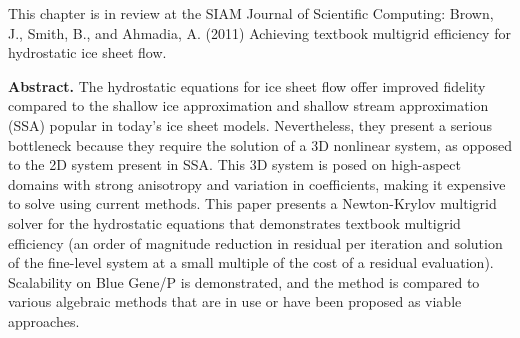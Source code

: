\newcommand\citep[1]{\cite{#1}}
\textsf{This chapter is in review at the SIAM Journal of Scientific Computing: Brown, J., Smith, B., and Ahmadia, A. (2011) Achieving textbook multigrid efficiency for hydrostatic ice sheet flow.}
\vspace{0.5cm}

\graphicspath{{/home/jed/tme-ice/figures/}}

\textbf{Abstract.}
The hydrostatic equations for ice sheet flow offer improved fidelity compared to the shallow ice approximation and shallow stream approximation (SSA) popular in today's ice sheet models. Nevertheless, they present a serious bottleneck because they require the solution of a 3D nonlinear system, as opposed to the 2D system present in SSA.  This 3D system is posed on high-aspect domains with strong anisotropy and variation in coefficients, making it expensive to solve using current methods.  This paper presents a Newton-Krylov multigrid solver for the hydrostatic equations that demonstrates textbook multigrid efficiency (an order of magnitude reduction in residual per iteration and solution of the fine-level system at a small multiple of the cost of a residual evaluation).  Scalability on Blue Gene/P is demonstrated, and the method is compared to various algebraic methods that are in use or have been proposed as viable approaches.


